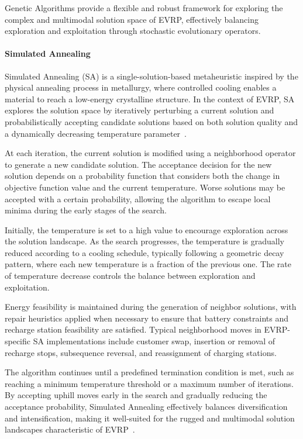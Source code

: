 Genetic Algorithms provide a flexible and robust framework for exploring the complex and multimodal solution space of EVRP, effectively balancing exploration and exploitation through stochastic evolutionary operators.


\paragraph{Simulated Annealing}

Simulated Annealing (SA) is a single-solution-based metaheuristic inspired by the physical annealing process in metallurgy, where controlled cooling enables a material to reach a low-energy crystalline structure. In the context of EVRP, SA explores the solution space by iteratively perturbing a current solution and probabilistically accepting candidate solutions based on both solution quality and a dynamically decreasing temperature parameter~\cite{erdougdu2020distance}.

At each iteration, the current solution is modified using a neighborhood operator to generate a new candidate solution. The acceptance decision for the new solution depends on a probability function that considers both the change in objective function value and the current temperature. Worse solutions may be accepted with a certain probability, allowing the algorithm to escape local minima during the early stages of the search.

Initially, the temperature is set to a high value to encourage exploration across the solution landscape. As the search progresses, the temperature is gradually reduced according to a cooling schedule, typically following a geometric decay pattern, where each new temperature is a fraction of the previous one. The rate of temperature decrease controls the balance between exploration and exploitation.

Energy feasibility is maintained during the generation of neighbor solutions, with repair heuristics applied when necessary to ensure that battery constraints and recharge station feasibility are satisfied. Typical neighborhood moves in EVRP-specific SA implementations include customer swap, insertion or removal of recharge stops, subsequence reversal, and reassignment of charging stations.

The algorithm continues until a predefined termination condition is met, such as reaching a minimum temperature threshold or a maximum number of iterations. By accepting uphill moves early in the search and gradually reducing the acceptance probability, Simulated Annealing effectively balances diversification and intensification, making it well-suited for the rugged and multimodal solution landscapes characteristic of EVRP~\cite{ghobadi2021multi}.

